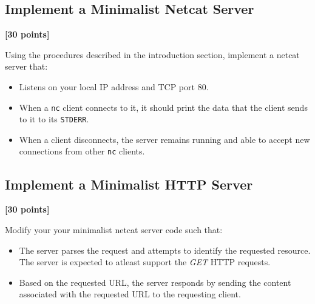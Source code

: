 \documentclass[pdftex,12pt,a4paper]{article}
\begin{document}
        \subsection{Implement a Minimalist Netcat Server}
            \begin{flushright}
                \textbf{[30 points]}
            \end{flushright}

            Using the procedures described in the introduction section, implement a netcat server that:
            \begin{itemize}
                \item Listens on your local IP address and TCP port 80.
                \item When a \texttt{nc} client connects to it, it should print
                    the data that the client sends to it to its \texttt{STDERR}.
                \item When a client disconnects, the server remains running and
                    able to accept new connections from other \texttt{nc} clients.
            \end{itemize}

        \subsection{Implement a Minimalist HTTP Server}
            \begin{flushright}
                \textbf{[30 points]}
            \end{flushright}

            Modify your your minimalist netcat server code such that:
            \begin{itemize}
                \item The server parses the request and attempts to identify
                    the requested resource. The server is expected to atleast
                    support the \emph{GET} HTTP requests. 
                \item Based on the requested URL, the server responds by
                    sending the content associated with the requested URL to
                    the requesting client.
                \end{itemize}
\end{document}
